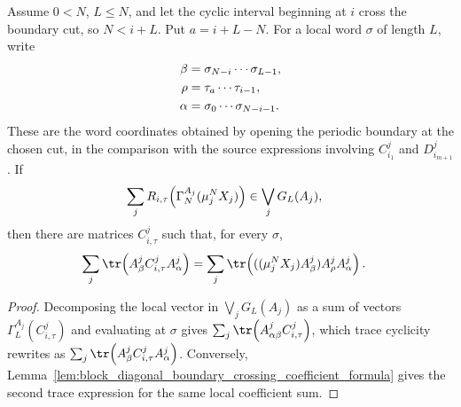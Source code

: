 \begin{lemma}
    \label{lem:block_diagonal_boundary_crossing_trace_decomposition}
    \leanok
    Assume $0<N$, $L\le N$, and let the cyclic interval beginning at $i$
    cross the boundary cut, so $N<i+L$. Put $a=i+L-N$. For a local word
    $\sigma$ of length $L$, write
    \begin{align}
        \beta
         & =\sigma_{N-i}\cdots\sigma_{L-1},
        \notag                              \\
        \rho
         & =\tau_a\cdots\tau_{i-1},
        \notag                              \\
        \alpha
         & =\sigma_0\cdots\sigma_{N-i-1}.
        \notag
    \end{align}
    These are the word coordinates obtained by opening the periodic boundary at
    the chosen cut, in the comparison with the source expressions involving
    $C^j_{i_1}$ and $D^j_{i_{m+1}}$. If
    \begin{align}
        \sum_j
        R_{i,\tau}\!\left(\Gamma_N^{A_j}(\mu_j^NX_j)\right)
         & \in\bigvee_jG_L(A_j),
        \notag
    \end{align}
    then there are matrices $C^j_{i,\tau}$ such that, for every $\sigma$,
    \begin{align}
        \sum_j\tr\!\left(A^j_\beta C^j_{i,\tau}A^j_\alpha\right)
         & =
        \sum_j\tr\!\left(((\mu_j^NX_j)A^j_\beta)A^j_\rho A^j_\alpha\right).
        \notag
    \end{align}
\end{lemma}

\begin{proof}
    \leanok
    Decomposing the local vector in $\bigvee_jG_L(A_j)$ as a sum of vectors
    $\Gamma_L^{A_j}(C^j_{i,\tau})$ and evaluating at $\sigma$ gives
    $\sum_j\tr\!\left(A^j_{\alpha\beta}C^j_{i,\tau}\right)$, which trace
    cyclicity rewrites as
    $\sum_j\tr\!\left(A^j_\beta C^j_{i,\tau}A^j_\alpha\right)$. Conversely,
    Lemma~\ref{lem:block_diagonal_boundary_crossing_coefficient_formula}
    gives the second trace expression for the same local coefficient sum.
\end{proof}

